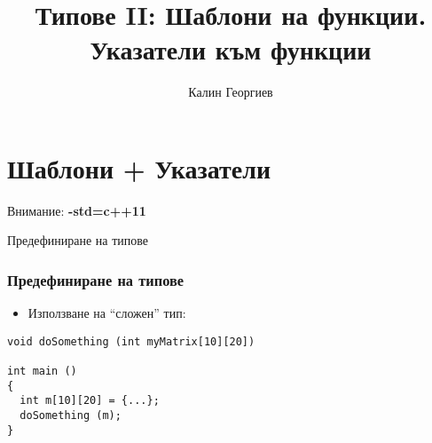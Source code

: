 \documentclass{beamer}
\begin{document}
\title[Обектно ориентирано програмиране]{Типове II: Шаблони на функции. Указатели към функции} 
\author{Калин Георгиев} 
\frame{\titlepage} 


\section{Шаблони + Указатели} 




\begin{frame}
\centerline{Внимание: \textbf{-std=c++11}}
\end{frame}

\begin{frame}
\centerline{Предефиниране на типове}
\end{frame}

\begin{frame}[fragile]
\frametitle{Предефиниране на типове}

\begin{itemize}
  \item Използване на ``сложен'' тип:
\end{itemize}

\begin{flushleft}
\begin{lstlisting}
void doSomething (int myMatrix[10][20])

int main ()
{
  int m[10][20] = {...};
  doSomething (m);
}
\end{lstlisting}	
\end{flushleft}

\end{frame}
\end{document}
